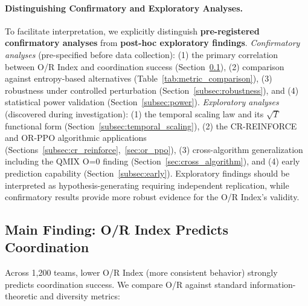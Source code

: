 \documentclass[twoside]{article}
\newcommand{\ORIndex}{O/R Index}
\theoremstyle{remark}
\begin{document}
\paragraph{Distinguishing Confirmatory and Exploratory Analyses.}
To facilitate interpretation, we explicitly distinguish \textbf{pre-registered confirmatory analyses} from \textbf{post-hoc exploratory findings}. \textit{Confirmatory analyses} (pre-specified before data collection): (1) the primary correlation between O/R Index and coordination success (Section~\ref{subsec:main_finding}), (2) comparison against entropy-based alternatives (Table~\ref{tab:metric_comparison}), (3) robustness under controlled perturbation (Section~\ref{subsec:robustness}), and (4) statistical power validation (Section~\ref{subsec:power}). \textit{Exploratory analyses} (discovered during investigation): (1) the temporal scaling law and its $\sqrt{T}$ functional form (Section~\ref{subsec:temporal_scaling}), (2) the CR-REINFORCE and OR-PPO algorithmic applications (Sections~\ref{subsec:cr_reinforce},~\ref{sec:or_ppo}), (3) cross-algorithm generalization including the QMIX O=0 finding (Section~\ref{sec:cross_algorithm}), and (4) early prediction capability (Section~\ref{subsec:early}). Exploratory findings should be interpreted as hypothesis-generating requiring independent replication, while confirmatory results provide more robust evidence for the O/R Index's validity.

\subsection{Main Finding: O/R Index Predicts Coordination}
\label{subsec:main_finding}

Across 1,200 teams, lower \ORIndex{} (more consistent behavior) strongly predicts coordination success. We compare O/R against standard information-theoretic and diversity metrics:
\end{document}
